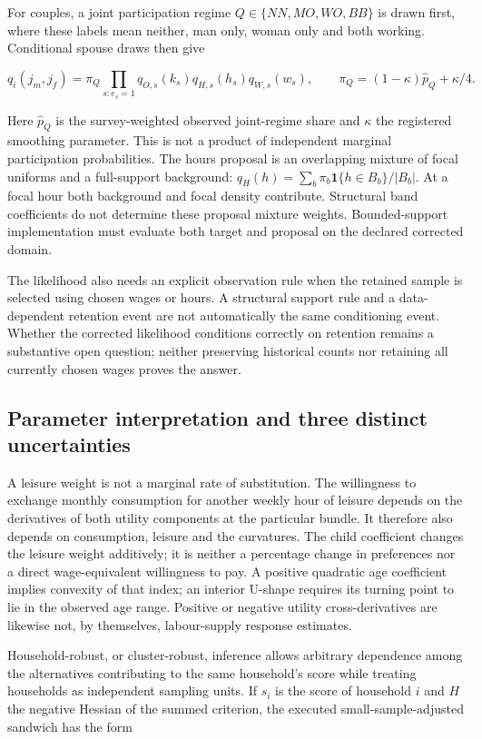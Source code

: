 \documentclass[11pt,a4paper]{article}
\begin{document}
For couples, a joint participation regime \(Q\in\{NN,MO,WO,BB\}\) is drawn first, where these labels mean neither, man only, woman only and both working. Conditional spouse draws then give

\[q_i(j_m,j_f)=\pi_Q\prod_{s:e_s=1}q_{O,s}(k_s)q_{H,s}(h_s)q_{W,s}(w_s),\qquad
\pi_Q=(1-\kappa)\widehat p_Q+\kappa/4.\]

Here \(\widehat p_Q\) is the survey-weighted observed joint-regime share and \(\kappa\) the registered smoothing parameter. This is not a product of independent marginal participation probabilities. The hours proposal is an overlapping mixture of focal uniforms and a full-support background: \(q_H(h)=\sum_b\pi_b\mathbf1\{h\in B_b\}/|B_b|\). At a focal hour both background and focal density contribute. Structural band coefficients do not determine these proposal mixture weights. Bounded-support implementation must evaluate both target and proposal on the declared corrected domain.

The likelihood also needs an explicit observation rule when the retained sample is selected using chosen wages or hours. A structural support rule and a data-dependent retention event are not automatically the same conditioning event. Whether the corrected likelihood conditions correctly on retention remains a substantive open question; neither preserving historical counts nor retaining all currently chosen wages proves the answer.

\subsection{Parameter interpretation and three distinct uncertainties}\label{parameter-interpretation-and-three-distinct-uncertainties}

A leisure weight is not a marginal rate of substitution. The willingness to exchange monthly consumption for another weekly hour of leisure depends on the derivatives of both utility components at the particular bundle. It therefore also depends on consumption, leisure and the curvatures. The child coefficient changes the leisure weight additively; it is neither a percentage change in preferences nor a direct wage-equivalent willingness to pay. A positive quadratic age coefficient implies convexity of that index; an interior U-shape requires its turning point to lie in the observed age range. Positive or negative utility cross-derivatives are likewise not, by themselves, labour-supply response estimates.

Household-robust, or cluster-robust, inference allows arbitrary dependence among the alternatives contributing to the same household's score while treating households as independent sampling units. If \(s_i\) is the score of household \(i\) and \(H\) the negative Hessian of the summed criterion, the executed small-sample-adjusted sandwich has the form
\end{document}
